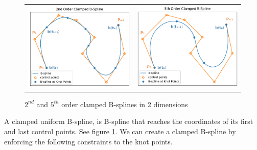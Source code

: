 \documentclass{article}
\begin{document}
\begin{figure}[H]
\begin{tabular}{ll}
\includegraphics[scale=.4]{2ndOrderClampedBspline.png}
&
\includegraphics[scale=.4]{5thOrderClampedBspline.png}
\end{tabular}
\caption{$2^{nd}$ and $5^{th}$ order clamped B-splines in 2 dimensions}
\label{Fig:Clamped Uniform B-Splines}
\end{figure}

A clamped uniform B-spline, is B-spline that reaches the coordinates of its first and last control points. See figure \ref{Fig:Clamped Uniform B-Splines}. We can create a clamped B-spline by enforcing the following constraints to the knot points.
\end{document}
